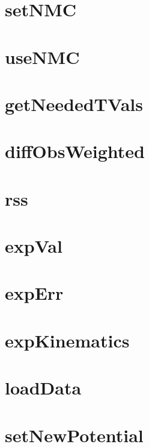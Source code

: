 \documentclass{book}
\begin{document}
\section{setNMC}

\section{useNMC}

\section{getNeededTVals}

\section{diffObsWeighted}

\section{rss}

\section{expVal}

\section{expErr}

\section{expKinematics}

\section{loadData}

\section{setNewPotential}
\end{document}

